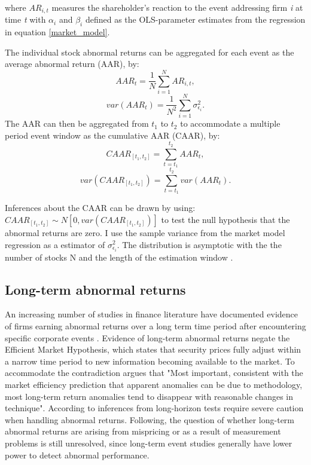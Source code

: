  where $AR_{i,t}$ measures the shareholder's reaction to the event addressing firm \textit{i} at time \textit{t}  with $\alpha_i$ and $\beta_i$ defined as the OLS-parameter estimates from the regression in equation \ref{market_model}.
  
 The individual stock abnormal returns can be aggregated for each event as the average abnormal return (AAR), by:  
 \begin{equation}
 AAR_t = \frac{1}{N} \sum_{i=1} ^N AR_{i,t},
 \end{equation}
 \begin{equation}
 var(AAR_{t}) = \frac{1}{N^2} \sum_{i=1} ^N \sigma_{\epsilon_i} ^2.
 \end{equation}
 The AAR can then be aggregated from $t_1$ to $t_2$ to accommodate a multiple period event window as the cumulative AAR (CAAR), by:
 \begin{equation}
 CAAR_{[t_1,t_2]} = \sum_{t = t_1 } ^{t_2} AAR_{t},
 \end{equation}
 \begin{equation}
 var(CAAR_{[t_1,t_2]}) = \sum ^{t_2}_{t=t_1} var(AAR_t).
 \end{equation}
 
Inferences about the CAAR can be drawn by using: $CAAR_{[t_1,t_2]} \sim N[0,var(CAAR_{[t_1,t_2]})]$ to test the null hypothesis that the abnormal returns are zero. I use the sample variance from the market model regression as a estimator of $\sigma^2_{\epsilon_i}$. The distribution is asymptotic with the the number of stocks N and the length of the estimation window \cite{Event_studies}.  
 
 

\subsection{Long-term abnormal returns}

An increasing number of studies in finance literature have documented evidence of firms earning abnormal returns over a long term time period after encountering specific corporate events \citep{kothari}. Evidence of long-term abnormal returns negate the Efficient Market Hypothesis, which states that security prices fully adjust within a narrow time period to new information becoming available to the market. To accommodate the contradiction \cite{fama1998_events} argues that "Most important, consistent with the market efficiency prediction that apparent anomalies can be due to methodology, most long-term return anomalies tend to disappear with reasonable changes in technique". According to \cite{kothari} inferences from long-horizon tests require severe caution when handling abnormal returns. Following, the question of whether long-term abnormal returns are arising from mispricing or as a result of measurement problems is still unresolved, since long-term event studies generally have lower power to detect abnormal performance. 

